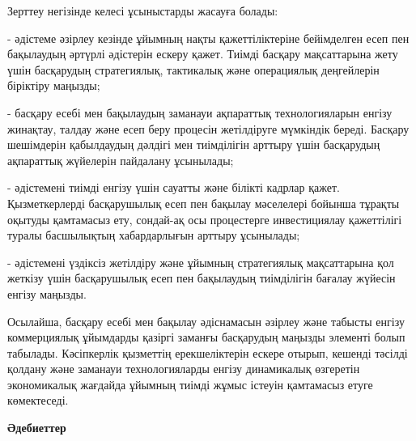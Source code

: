 \begin{multicols}{2}
Зерттеу негізінде келесі ұсыныстарды жасауға болады:

- әдістеме әзірлеу кезінде ұйымның нақты қажеттіліктеріне бейімделген
есеп пен бақылаудың әртүрлі әдістерін ескеру қажет. Тиімді басқару
мақсаттарына жету үшін басқарудың стратегиялық, тактикалық және
операциялық деңгейлерін біріктіру маңызды;

- басқару есебі мен бақылаудың заманауи ақпараттық технологияларын
енгізу жинақтау, талдау және есеп беру процесін жетілдіруге мүмкіндік
береді. Басқару шешімдерін қабылдаудың дәлдігі мен тиімділігін арттыру
үшін басқарудың ақпараттық жүйелерін пайдалану ұсынылады;

- әдістемені тиімді енгізу үшін сауатты және білікті кадрлар қажет.
Қызметкерлерді басқарушылық есеп пен бақылау мәселелері бойынша тұрақты
оқытуды қамтамасыз ету, сондай-ақ осы процестерге инвестициялау
қажеттілігі туралы басшылықтың хабардарлығын арттыру ұсынылады;

- әдістемені үздіксіз жетілдіру және ұйымның стратегиялық мақсаттарына
қол жеткізу үшін басқарушылық есеп пен бақылаудың тиімділігін бағалау
жүйесін енгізу маңызды.

Осылайша, басқару есебі мен бақылау әдіснамасын әзірлеу және табысты
енгізу коммерциялық ұйымдарды қазіргі заманғы басқарудың маңызды
элементі болып табылады. Кәсіпкерлік қызметтің ерекшеліктерін ескере
отырып, кешенді тәсілді қолдану және заманауи технологияларды енгізу
динамикалық өзгеретін экономикалық жағдайда ұйымның тиімді жұмыс істеуін
қамтамасыз етуге көмектеседі.
\end{multicols}

\begin{center}
	{\bfseries Әдебиеттер}
	\end{center}
	
